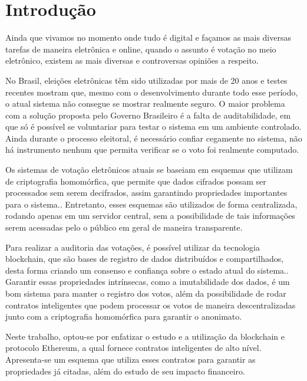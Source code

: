 \documentclass{ufsctex/ufsctex}
\begin{document}
\capa{}

\pretextuais{}

\listadefiguras{}

\listadetabelas{}

\listadeabreviaturas{}

\listadesimbolos{}

\sumario{}

\chapter{Introdução} Ainda que vivamos no momento onde tudo é digital e façamos
as mais diversas tarefas de maneira eletrônica e online, quando o assunto é
votação no meio eletrônico, existem as mais diversas e controversas opiniões a
respeito.

No Brasil, eleições eletrônicas têm sido utilizadas por mais de 20 anos e testes
recentes mostram que, mesmo com o desenvolvimento durante todo esse período, o
atual sistema não consegue se mostrar realmente seguro\cite{aranha}. O maior
problema com a solução proposta pelo Governo Brasileiro é a falta de
auditabilidade, em que só é possível se voluntariar para testar o sistema em um
ambiente controlado. Ainda durante o processo eleitoral, é necessário confiar
cegamente no sistema, não há instrumento nenhum que permita verificar se o voto
foi realmente computado.

Os sistemas de votação eletrônicos atuais se baseiam em esquemas que utilizam de
criptografia homomórfica, que permite que dados cifrados possam ser processados
sem serem decifrados, assim garantindo propriedades importantes para o
sistema.\cite{springer}. Entretanto, esses esquemas são utilizados de forma
centralizada, rodando apenas em um servidor central, sem a possibilidade de tais
informações serem acessadas pelo o público em geral de maneira transparente.

Para realizar a auditoria das votações, é possível utilizar da tecnologia
blockchain, que são bases de registro de dados distribuídos e compartilhados,
desta forma criando um consenso e confiança sobre o estado atual do
sistema.\cite{nakamoto2012bitcoin}.  Garantir essas propriedades intrínsecas,
como a imutabilidade dos dados, é um bom sistema para manter o registro dos
votos, além da possibilidade de rodar contratos inteligentes que podem processar
os votos de maneira descentralizadas junto com a criptografia homomórfica para
garantir o anonimato.

Neste trabalho, optou-se por enfatizar o estudo e a utilização da blockchain e
protocolo Ethereum, a qual fornece contratos inteligentes de alto
nível\cite{ethereum}.  Apresenta-se um esquema que utiliza esses contratos para
garantir as propriedades já citadas, além do estudo de seu impacto financeiro.
\end{document}

